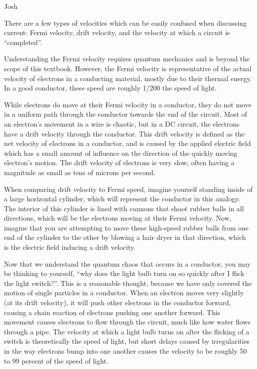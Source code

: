 \begin{studentOpinion}{Josh}{
There are a few types of velocities which can be easily confused when discussing current: Fermi velocity, drift velocity, and the velocity at which a circuit is ``completed''.

Understanding the Fermi velocity requires quantum mechanics and is beyond the scope of this textbook. However, the Fermi velocity is representative of the actual velocity of electrons in a conducting material, mostly due to their thermal energy. In a good conductor, these speed are roughly 1/200 the speed of light.

While electrons do move at their Fermi velocity in a conductor, they do not move in a uniform path through the conductor towards the end of the circuit. Most of an electron's movement in a wire is chaotic, but in a DC circuit, the electrons have a drift velocity through the conductor. This drift velocity is defined as the net velocity of electrons in a conductor, and is caused by the applied electric field which has a small amount of influence on the direction of the quickly moving electron's motion. The drift velocity of electrons is very slow, often having a magnitude as small as tens of microns per second.

When comparing drift velocity to Fermi speed, imagine yourself standing inside of a large horizontal cylinder, which will represent the conductor in this analogy. The interior of this cylinder is lined with cannons that shoot rubber balls in all directions, which will be the electrons moving at their Fermi velocity. Now, imagine that you are attempting to move these high-speed rubber balls from one end of the cylinder to the other by blowing a hair dryer in that direction, which is the electric field inducing a drift velocity.

Now that we understand the quantum chaos that occurs in a conductor, you may be thinking to yourself, ``why does the light bulb turn on so quickly after I flick the light switch?''. This is a reasonable thought, because we have only covered the motion of single particles in a conductor. When an electron moves very slightly (at its drift velocity), it will push other electrons in the conductor forward, causing a chain reaction of electrons pushing one another forward. This movement causes electrons to flow through the circuit, much like how water flows through a pipe. The velocity at which a light bulb turns on after the flicking of a switch is theoretically the speed of light, but short delays caused by irregularities in the way electrons bump into one another causes the velocity to be roughly 50 to 99 percent of the speed of light.
}
\end{studentOpinion}

